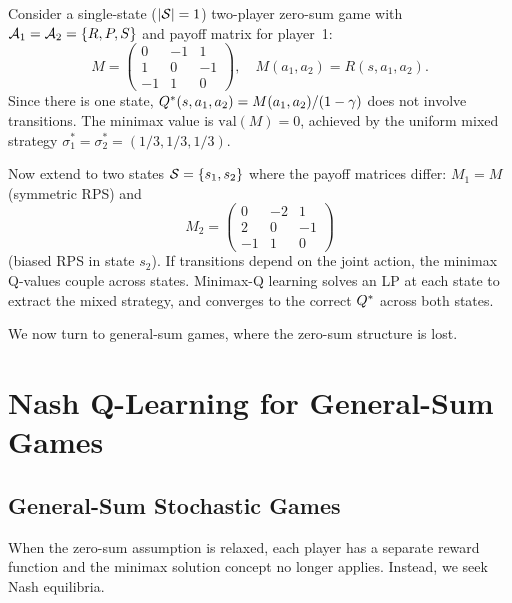 \documentclass[11pt,a4paper]{article}
\begin{document}
\begin{example}
\label{ex:rps}
Consider a single-state ($|\mathcal{S}| = 1$) two-player zero-sum game
with $\mathcal{A}_1 = \mathcal{A}_2 = \{R, P, S\}$ and payoff matrix for
player~1:
\[
  M = \begin{pmatrix}
    0 & -1 & 1 \\
    1 & 0 & -1 \\
    -1 & 1 & 0
  \end{pmatrix},
  \quad
  M(a_1, a_2) = R(s, a_1, a_2).
\]
Since there is one state, $Q^*(s, a_1, a_2) = M(a_1, a_2) / (1 - \gamma)$
does not involve transitions.  The minimax value is
$\mathrm{val}(M) = 0$, achieved by the uniform mixed strategy
$\sigma_1^* = \sigma_2^* = (1/3, 1/3, 1/3)$.

Now extend to two states $\mathcal{S} = \{s_1, s_2\}$ where the payoff
matrices differ: $M_1 = M$ (symmetric RPS) and
\[
  M_2 = \begin{pmatrix}
    0 & -2 & 1 \\
    2 & 0 & -1 \\
    -1 & 1 & 0
  \end{pmatrix}
\]
(biased RPS in state $s_2$).  If transitions depend on the joint action,
the minimax Q-values couple across states.  Minimax-Q learning solves an
LP at each state to extract the mixed strategy, and converges to the
correct $Q^*$ across both states.
\end{example}

We now turn to general-sum games, where the zero-sum structure is lost.


\section{Nash Q-Learning for General-Sum Games}
\label{sec:nashq}

\subsection{General-Sum Stochastic Games}

When the zero-sum assumption is relaxed, each player has a separate
reward function and the minimax solution concept no longer applies.
Instead, we seek Nash equilibria.
\end{document}
